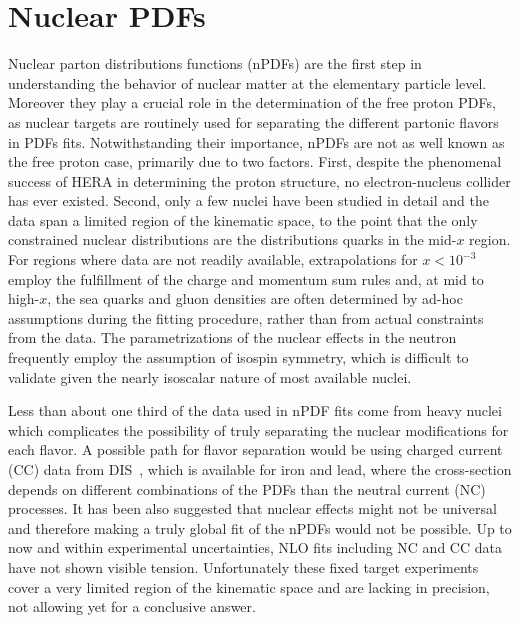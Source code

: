 
\section{Nuclear PDFs\label{sec:nPDFs}}
%
Nuclear parton distributions functions (nPDFs) are the first step in understanding the behavior of nuclear matter at the elementary particle level. Moreover they play a crucial role in the determination of the free proton PDFs, as nuclear targets are routinely used for separating the different partonic flavors in PDFs fits. Notwithstanding their importance, nPDFs are not as well known as the free proton case, primarily due to two factors. First, despite the phenomenal success of HERA in determining the proton structure, no electron-nucleus collider has ever existed. Second, only a few nuclei have been studied in detail and the data span a limited region of the kinematic space, to the point that the only constrained nuclear distributions are the distributions quarks in the mid-$x$ region.  For regions where data are not readily available, extrapolations for $x < 10^{-3}$ employ the fulfillment of the charge and momentum sum rules and, at mid to high-$x$, the sea quarks and gluon densities are often determined by ad-hoc assumptions during the fitting procedure, rather than from actual constraints from the data.  The parametrizations of the nuclear effects in the neutron frequently employ the assumption of isospin symmetry, which is difficult to validate given the nearly isoscalar nature of most available nuclei.

Less than about one third of the data used in nPDF fits come from heavy nuclei which complicates the possibility of truly separating the nuclear modifications for each flavor. A possible path for flavor separation would be using charged current (CC) data from DIS~\cite{Tzanov:2005kr,Onengut:2005kv,Tzanov:2009zz}, which is available for iron and lead, where the cross-section depends on different combinations of the PDFs than the neutral current (NC) processes. It has been also suggested that nuclear effects might not be universal and therefore making a truly global fit of the nPDFs would not be possible. Up to now and within experimental uncertainties, NLO fits including NC and CC data have not shown visible tension. Unfortunately these fixed target experiments cover a very limited region of the kinematic space and are lacking in precision, not allowing yet for a conclusive answer.


